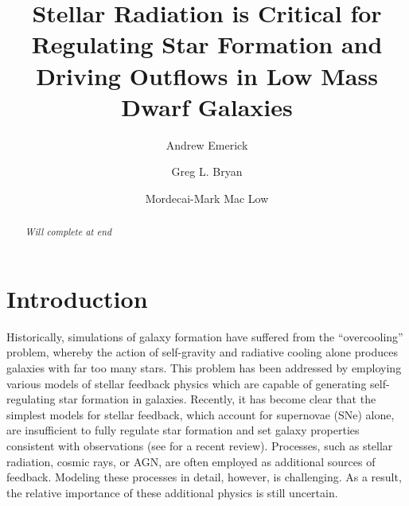 \documentclass[twocolumn]{aastex62}
\begin{document}
\title{Stellar Radiation is Critical for Regulating Star Formation and Driving Outflows in Low Mass Dwarf Galaxies}


\author{Andrew Emerick}

\author{Greg L. Bryan}

\author{Mordecai-Mark Mac Low}
\nocollaboration

\begin{abstract}
\textit{Will complete at end}
\end{abstract}


\section{Introduction} \label{sec:intro}
Historically, simulations of galaxy formation have suffered from the ``overcooling'' problem, whereby the action of self-gravity and radiative cooling alone produces galaxies with far too many stars. This problem has been addressed by employing various models of stellar feedback physics which are capable of generating self-regulating star formation in galaxies. Recently, it has become clear that the simplest models for stellar feedback, which account for supernovae (SNe) alone, are insufficient \citep{Smith2018} to fully regulate star formation and set galaxy properties consistent with observations (see \cite{NaabOstriker2017} for a recent review). Processes, such as stellar radiation, cosmic rays, or AGN, are often employed as additional sources of feedback. Modeling these processes in detail, however, is challenging. As a result, the relative importance of these additional physics is still uncertain.
\end{document}
